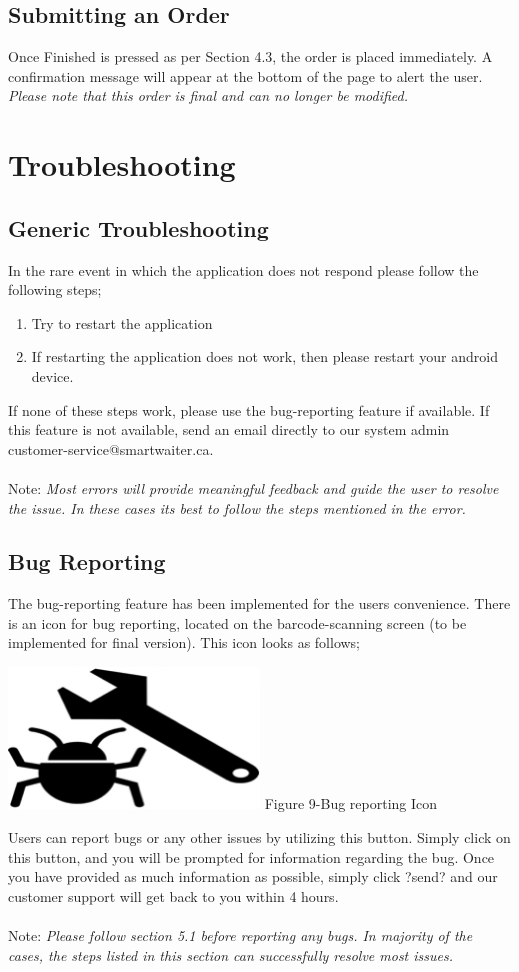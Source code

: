 \documentclass[12pt, titlepage]{article}
\begin{document}
\subsection{Submitting an Order}
Once Finished is pressed as per Section 4.3, the order is placed immediately. A confirmation message will appear at the bottom of the page to alert the user.  \emph{Please note that this order is final and can no longer be modified.}

\section{Troubleshooting}
\subsection{Generic Troubleshooting}
In the rare event in which the application does not respond please follow the following steps;
\begin{enumerate}
	\item Try to restart the application
	\item If restarting the application does not work, then please restart your android device.
	\end{enumerate}
	If none of these steps work, please use the bug-reporting feature if available. If this feature is not available, send an email directly to our system admin customer-service@smartwaiter.ca.\\\\
	Note:  \emph{Most errors will provide meaningful feedback and guide the user to resolve the issue. In these cases its best to follow the steps mentioned in the error.}
\subsection{Bug Reporting}
The bug-reporting feature has been implemented for the users convenience. There is an icon for bug reporting, located on the barcode-scanning screen (to be implemented for final version). This icon looks as follows;\\
\begin{center}
	\includegraphics[width=0.5\textwidth]{bugReport.png}
	\linebreak Figure 9-Bug reporting Icon
\end{center}
Users can report bugs or any other issues by utilizing this button. Simply click on this button, and you will be prompted for information regarding the bug. Once you have provided as much information as possible, simply click ?send? and our customer support will get back to you within 4 hours.\\\\
Note:  \emph{Please follow section 5.1 before reporting any bugs.  In majority of the cases, the steps listed in this section can successfully resolve most issues.}
\end{document}
